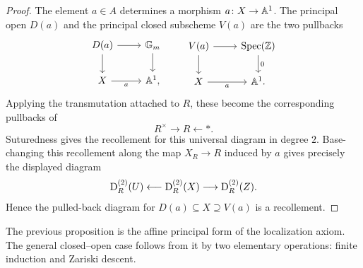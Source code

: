 \documentclass[11pt]{book}
\begin{document}
	\begin{proof}
		The element $a\in A$ determines a morphism $a\colon X\to\mathbb{A}^1$. The principal open $D(a)$ and the principal closed subscheme $V(a)$ are the two pullbacks
		\[
		\begin{tikzcd}
			D(a) \rar \dar & \bbG_m \dar \\
			X \rar["a"'] & \bbA^1,
		\end{tikzcd}
		\qquad
		\begin{tikzcd}
			V(a) \rar \dar & \Spec(\Z) \dar["0"] \\
			X \rar["a"'] & \bbA^1.
		\end{tikzcd}
		\]
		Applying the transmutation attached to $R$, these become the corresponding pullbacks of
		\[
			R^\times\longrightarrow R\longleftarrow *.
		\]
		Suturedness gives the recollement for this universal diagram in degree $2$. Base-changing this recollement along the map $X_R\to R$ induced by $a$ gives precisely the displayed diagram
		\[
			\operatorname{\mathrm{D}}^{(2)}_R(U)\longleftarrow\operatorname{\mathrm{D}}^{(2)}_R(X)\longrightarrow\operatorname{\mathrm{D}}^{(2)}_R(Z).
		\]
		Hence the pulled-back diagram for $D(a)\subseteq X\supseteq V(a)$ is a recollement.
	\end{proof}

	The previous proposition is the affine principal form of the localization axiom. The general closed--open case follows from it by two elementary operations: finite induction and Zariski descent.
\end{document}
